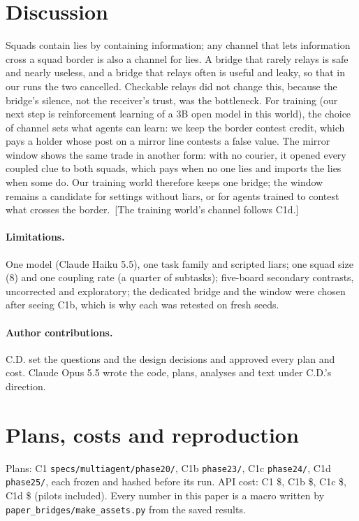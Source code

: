 \documentclass{article}
\newcommand{\pending}[1]{\textcolor{orange!70!black}{[#1]}}
\begin{document}
\section{Discussion}

Squads contain lies by containing information; any channel that lets information cross a squad border is also a channel for lies. A bridge that rarely relays is safe and nearly useless, and a bridge that relays often is useful and leaky, so that in our runs the two cancelled. Checkable relays did not change this, because the bridge's silence, not the receiver's trust, was the bottleneck. For training (our next step is reinforcement learning of a 3B open model in this world), the choice of channel sets what agents can learn: we keep the border contest credit, which pays a holder whose post on a mirror line contests a false value.
\ifCOneD{} The mirror window shows the same trade in another form: with no courier, it opened every coupled clue to both squads, which pays when no one lies and imports the lies when some do. Our training world therefore keeps one bridge; the window remains a candidate for settings without liars, or for agents trained to contest what crosses the border.\else\ \pending{The training world's channel follows C1d.}\fi

\paragraph{Limitations.} One model (Claude Haiku 5.5), one task family and scripted liars; one squad size (8) and one coupling rate (a quarter of subtasks); five-board secondary contrasts, uncorrected and exploratory; the dedicated bridge and the window were chosen after seeing C1b, which is why each was retested on fresh seeds.

\paragraph{Author contributions.} C.D. set the questions and the design decisions and approved every plan and cost. Claude Opus 5.5 wrote the code, plans, analyses and text under C.D.'s direction.




\appendix
\section{Plans, costs and reproduction}
\label{app:repro}

Plans: C1 \texttt{specs/multiagent/phase20/}, C1b \texttt{phase23/}, C1c \texttt{phase24/}, C1d \texttt{phase25/}, each frozen and hashed before its run. API cost: C1 \$\CostOne, C1b \$\CostB, C1c \$\CostC\ifCOneD, C1d \$\CostD\fi{} (pilots included). Every number in this paper is a macro written by \texttt{paper\_bridges/make\_assets.py} from the saved results.
\end{document}
